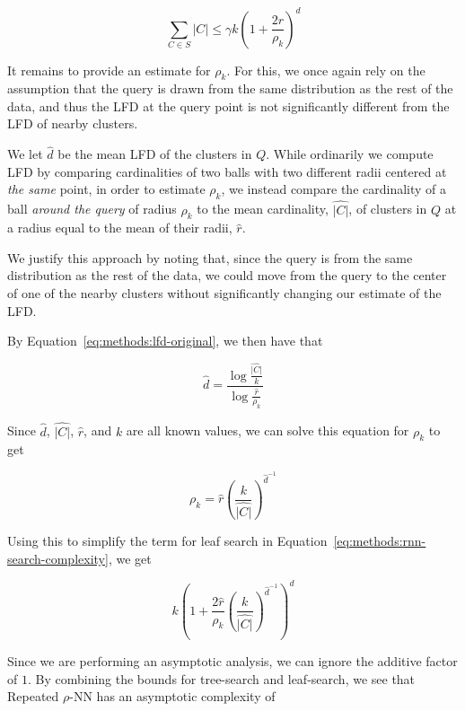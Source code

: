 \begin{equation*}
    \sum_{C \in S} |C| \leq \gamma k \left( 1+ \frac{2\hat{r}}{\rho_k} \right)^d
\end{equation*}

It remains to provide an estimate for $\rho_k$. 
For this, we once again rely on the assumption that the query is drawn from the same distribution as the rest of the data, and thus the LFD at the query point is not significantly different from the LFD of nearby clusters.

We let $\hat{d}$ be the mean LFD of the clusters in $Q$.
While ordinarily we compute LFD by comparing cardinalities of two balls with two different radii centered at \emph{the same} point, in order to estimate $\rho_k$, we instead compare the cardinality of a ball \emph{around the query} of radius $\rho_k$ to the mean cardinality, $\hat{|C|}$, of clusters in $Q$ at a radius equal to the mean of their radii, $\hat{r}$.

We justify this approach by noting that, since the query is from the same distribution as the rest of the data, we could move from the query to the center of one of the nearby clusters without significantly changing our estimate of the LFD.

By Equation~\ref{eq:methods:lfd-original}, we then have that

\begin{equation*}
    \hat{d} = \frac{\log{}\frac{\hat{|C|}}{k}}{\log{}\frac{\hat{r}}{\rho_k}}
\end{equation*}

Since $\hat{d}$, $\hat{|C|}$, $\hat{r}$, and $k$ are all known values, we can solve this equation for $\rho_k$ to get

\begin{equation*}
    \rho_k = \hat{r} \left( \frac{k}{\hat{|C|}} \right)^{\hat{d}^{-1}}
\end{equation*}

Using this to simplify the term for leaf search in Equation~\ref{eq:methods:rnn-search-complexity}, we get

\begin{equation*}
    k \left( 1+ \frac{2\hat{r}}{\rho_k} \left( \frac{k}{\hat{|C|}} \right) ^ {\hat{d}^{-1}} \right)^d
\end{equation*}

Since we are performing an asymptotic analysis, we can ignore the additive factor of $1$.
By combining the bounds for tree-search and leaf-search, we see that Repeated $\rho$-NN has an asymptotic complexity of

